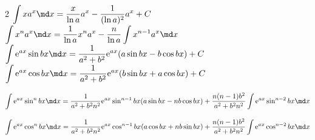 \begin{multicols}{2}
    \(\displaystyle \int x a^x \md x = \dfrac{x}{\ln a}a^x-\dfrac{1}{(\ln a)^2}a^x+C\) \\
    \(\displaystyle \int x^n a^x \md x= \dfrac{1}{\ln a}x^n a^x-\dfrac{n}{\ln a}\int x^{n-1}a^x \md x\) \\
    \(\displaystyle \int \mathrm{e}^{ax} \sin bx \md x = \dfrac{1}{a^2+b^2}\mathrm{e}^{ax}(a \sin bx - b \cos bx)+C\) \\
    \(\displaystyle \int \mathrm{e}^{ax} \cos bx \md x = \dfrac{1}{a^2+b^2}\mathrm{e}^{ax}(b \sin bx + a \cos bx)+C\)
\end{multicols}

\[
    \int \mathrm{e}^{ax} \sin ^ n bx \md x=\dfrac{1}{a^2+b^2 n^2}\mathrm{e}^{ax} \sin ^ {n-1} bx (a \sin bx -nb \cos bx) +\dfrac{n(n-1)b^2}{a^2+b^2 n^2}\int \mathrm{e}^{ax} \sin ^{n-2} bx \md x
\]

\[
    \int \mathrm{e}^{ax} \cos ^ n bx \md x=\dfrac{1}{a^2+b^2 n^2}\mathrm{e}^{ax} \cos ^ {n-1} bx (a \cos bx +nb \sin bx) +\dfrac{n(n-1)b^2}{a^2+b^2 n^2}\int \mathrm{e}^{ax} \cos ^{n-2} bx \md x
\]
